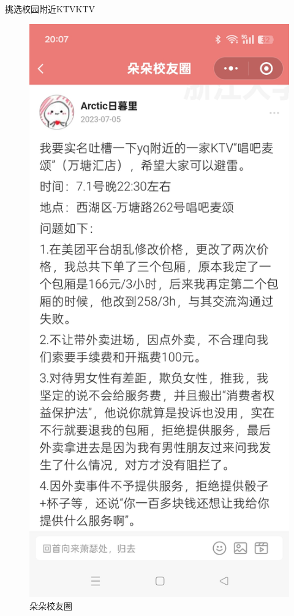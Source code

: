 \begin{exbox}{挑选校园附近KTV}{KTV}
\begin{enumerate}
  \begin{figure}[H]
    \centering
    \includegraphics[width=.5\textwidth]{./figures/生活/ktv/d1.jpg}
    \caption{朵朵校友圈}
  \end{figure}
  \end{enumerate}
\end{exbox}